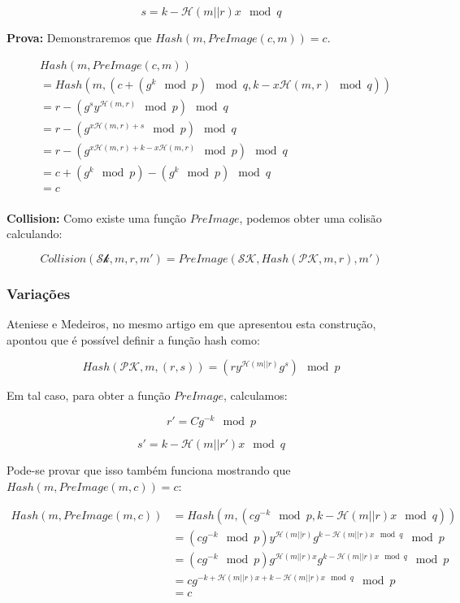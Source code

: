 \documentclass[a4paper]{article}
\begin{document}
$$
s = k-\mathcal{H}(m||r)x \mod q
$$

\textbf{Prova: }Demonstraremos que $Hash(m, PreImage(c, m)) = c$.

\begin{equation*}
  \begin{split}
    &Hash(m, PreImage(c, m))\\
    &= Hash(m, (c+(g^k \mod p) \mod q, k-x\mathcal{H}(m, r) \mod q))\\
    &= r - (g^sy^{\mathcal{H}(m, r)} \mod p) \mod q\\
    &= r - (g^{x\mathcal{H}(m, r) + s} \mod p) \mod q\\
    &= r - (g^{x\mathcal{H}(m, r) + k - x\mathcal{H}(m, r)} \mod p) \mod q\\
    &= c+ (g^k \mod p) - (g^{k} \mod p) \mod q\\
    &= c\\
  \end{split}
\end{equation*}



\textbf{Collision:} Como existe uma função $PreImage$, podemos
obter uma colisão calculando:

$$ Collision(\mathcal{Sk}, m, r, m') = PreImage(\mathcal{SK},
Hash(\mathcal{PK}, m, r), m')
$$

\subsubsection{Variações}

Ateniese e Medeiros, no mesmo artigo em que apresentou esta construção,
apontou que é possível definir a função hash como:

$$ Hash(\mathcal{PK}, m, (r, s)) =
\left(ry^{\mathcal{H}(m||r)}g^{s} \right)\mod p
$$

Em tal caso, para obter a função $PreImage$, calculamos:

$$
r'=Cg^{-k} \mod p
$$

$$
s' = k-\mathcal{H}(m||r')x \mod q
$$

Pode-se provar que isso também funciona mostrando que $Hash(m,
PreImage(m, c))=c$:

\begin{equation}
\begin{split}
  Hash(m, PreImage(m, c))
  &= Hash(m, (cg^{-k} \mod p, k-\mathcal{H}(m||r)x \mod q))\\
  &= (cg^{-k} \mod p)y^{\mathcal{H}(m||r)}g^{k-\mathcal{H}(m||r)x\mod q}\mod p\\
  &= (cg^{-k} \mod p)g^{\mathcal{H}(m||r)x}g^{k-\mathcal{H}(m||r)x\mod q}\mod p\\
  &= cg^{-k+\mathcal{H}(m||r)x+k-\mathcal{H}(m||r)x \mod q} \mod p\\
  &= c\\
\end{split}
\end{equation}
\end{document}
